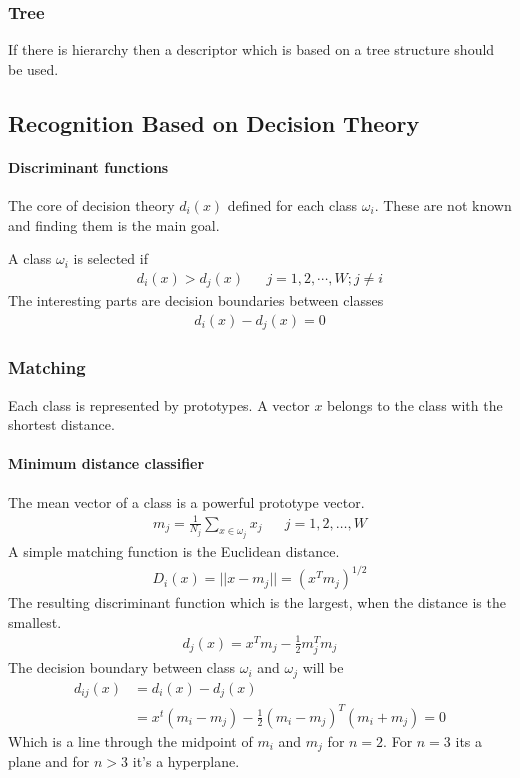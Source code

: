 \subsubsection{Tree}
If there is hierarchy then a descriptor which is based on a tree structure
should be used.


\subsection{Recognition Based on Decision Theory}
\paragraph{Discriminant functions}
The core of decision theory $d_i(x)$ defined for each class $\omega_i$.
These are not known and finding them is the main goal.

A class $\omega_i$ is selected if
\begin{align*}
d_i(x) > d_j(x) && j=1,2, \cdots, W; j \neq i
\end{align*}
The interesting parts are decision boundaries between classes
\begin{align*}
	d_i(x) - d_j(x) = 0
\end{align*}

\subsubsection{Matching}
Each class is represented by prototypes.
A vector $x$ belongs to the class with the shortest distance.
\paragraph{Minimum distance classifier}
The mean vector of a class is a powerful prototype vector.
\begin{align*}
	m_j = \frac{1}{N_j} \sum_{x\in \omega_j}x_j && j = 1,2,\dots, W
\end{align*}
A simple matching function is the Euclidean distance.
\begin{align*}
	D_i(x) = ||x-m_j|| = \left(x^Tm_j\right)^{1/2}
\end{align*}
The resulting discriminant function which is the largest, when the distance is
the smallest.
\begin{align*}
	d_j(x) = x^Tm_j - \frac{1}{2}m_j^Tm_j
\end{align*}
The decision boundary between class $\omega_i$ and $\omega_j$ will be
\begin{align*}
	d_{ij}(x) &= d_i(x) - d_j(x)\\
	&= x^t(m_i-m_j) - \frac{1}{2}(m_i-m_j)^T(m_i+m_j) = 0
\end{align*}
Which is a line through the midpoint of $m_i$ and $m_j$ for $n=2$.
For $n=3$ its a plane and for $n>3$ it's a hyperplane.

